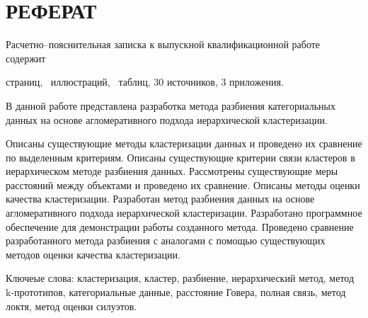 \chapter*{РЕФЕРАТ}

Расчетно–пояснительная записка к выпускной квалификационной работе содержит \begin{NoHyper}\pageref{LastPage}\end{NoHyper} страниц, \totfig~иллюстраций, \tottab~таблиц, 30 источников, 3 приложения. 

В данной работе представлена разработка метода разбиения категориальных данных на основе агломеративного подхода иерархической кластеризации.

Описаны существующие методы кластеризации данных и проведено их сравнение по выделенным критериям. Описаны существующие критерии связи кластеров в иерархическом методе разбиения данных. Рассмотрены существующие меры расстояний между объектами и проведено их сравнение. Описаны методы оценки качества кластеризации. Разработан метод разбиения данных на основе агломеративного подхода иерархической кластеризации. Разработано программное обеспечение для демонстрации работы созданного метода. Проведено сравнение разработанного метода разбиения с аналогами с помощью существующих методов оценки качества кластеризации.

Ключеые слова: кластеризация, кластер, разбиение, иерархический метод, метод k-прототипов, категориальные данные, расстояние Говера, полная связь, метод локтя, метод оценки силуэтов.
